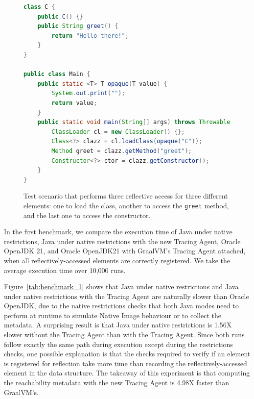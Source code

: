 \begin{figure}[ht]
    \centering
\begin{lstlisting}[language=Java]
class C {
    public C() {}
    public String greet() {
        return "Hello there!";
    }
}

public class Main {
    public static <T> T opaque(T value) {
        System.out.print("");
        return value;
    }
    public static void main(String[] args) throws Throwable {
        ClassLoader cl = new ClassLoader() {};
        Class<?> clazz = cl.loadClass(opaque("C"));
        Method greet = clazz.getMethod("greet");
        Constructor<?> ctor = clazz.getConstructor();
    }
}
\end{lstlisting}
    \caption{Test scenario that performs three reflective access for three different elements: one to load the class, another to access the \texttt{greet} method, and the last one to access the constructor.}
    \label{fig:benchmark}
\end{figure}

In the first benchmark, we compare the execution time of Java under native restrictions, Java under native restrictions with the new Tracing Agent, Oracle OpenJDK 21, and Oracle OpenJDK21 with GraalVM's Tracing Agent attached, when all reflectively-accessed elements are correctly registered. We take the average execution time over 10,000 runs.

Figure~\ref{tab:benchmark_1} shows that Java under native restrictions and Java under native restrictions with the Tracing Agent are naturally slower than Oracle OpenJDK, due to the native restrictions checks that both Java modes need to perform at runtime to simulate Native Image behaviour or to collect the metadata. 
A surprising result is that Java under native restrictions is 1.56X slower without the Tracing Agent than with the Tracing Agent. Since both runs follow exactly the same path during execution except during the restrictions checks, one possible explanation is that the checks required to verify if an element is registered for reflection take more time than recording the reflectively-accessed element in the data structure. The takeaway of this experiment is that computing the reachability metadata with the new Tracing Agent is 4.98X faster than GraalVM's.

